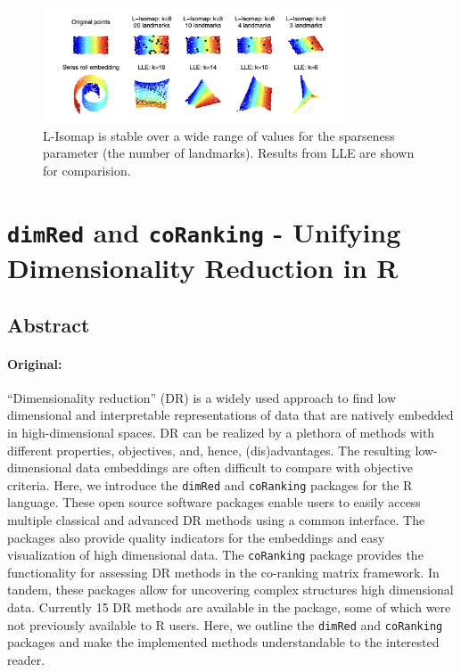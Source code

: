 \documentclass[a4paper,12pt]{article}
\begin{document}
\begin{figure}[ht]
    \centering
    \includegraphics[width=0.8\textwidth]{figures/LMDS_3.png}
    \caption{L-Isomap is stable over a wide range of values for the sparseness parameter (the number of landmarks). Results from LLE are shown for comparision\cite{deSilvaTenenbaum2002}.}
    \label{fig:LMDS}
\end{figure}


\pagebreak
\section{\texttt{dimRed} and \texttt{coRanking} - Unifying Dimensionality Reduction in R \texorpdfstring{\cite{Kraemer2018dimRedAC}}{}}
\label{sec:Kraemer2018dimRedAC}

\subsection{Abstract}

\paragraph{Original:} “Dimensionality reduction” (DR) is a widely used approach to find low dimensional and interpretable representations of data that are natively embedded in high-dimensional spaces. DR can be realized by a plethora of methods with different properties, objectives, and, hence, (dis)advantages. The resulting low-dimensional data embeddings are often difficult to compare with objective criteria. Here, we introduce the \texttt{dimRed} and \texttt{coRanking} packages for the R language. These open source software packages enable users to easily access multiple classical and advanced DR methods using a common interface. The packages also provide quality indicators for the embeddings and easy visualization of high dimensional data. The \texttt{coRanking} package provides the functionality for assessing DR methods in the co-ranking matrix framework. In tandem, these packages allow for uncovering complex structures high dimensional data. Currently 15 DR methods are available in the package, some of which were not previously available to R users. Here, we outline the \texttt{dimRed} and \texttt{coRanking} packages and make the implemented methods understandable to the interested reader.
\end{document}
